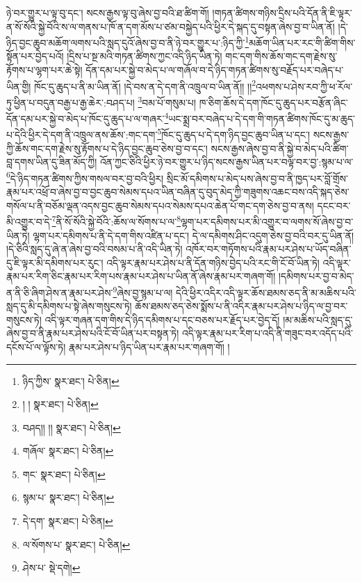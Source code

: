 ཉེ་བར་གྱུར་པ་ལྟ་བུ་དང་། སངས་རྒྱས་ལྟ་བུ་ཞེས་བྱ་བའི་ཐ་ཚིག་གོ། །གཏན་ཚིགས་གཉིས་དྲིས་པའི་དོན་ནི་ཇི་ལྟར་ན་སོ་སོའི་སྐྱེ་བོའི་ས་ལ་གནས་པ་ཁོ་ན་དག་མོས་པ་ཙམ་བསྐྱེད་པའི་ཕྱིར་དེ་སྐད་དུ་བསྟན་ཞེས་བྱ་བ་ཡིན་ནོ། །དེ་ཉིད་བྱང་ཆུབ་མཆོག་ལགས་པའི་སླད་དུའོ་ཞེས་བྱ་བ་ནི་ཉེ་བར་གྱུར་པ་:ཉིད་ཀྱི་\footnote{ཉིད་ཀྱིས་  སྣར་ཐང་།  པེ་ཅིན། }མཆོག་ཡིན་པར་རང་གི་ཚིག་གིས་སྟོན་པར་བྱེད་པའོ། །དྲིས་པ་སྔ་མའི་གཏན་ཚིགས་ཀྱང་འདི་ཉིད་ཡིན་ཏེ། གང་དག་གིས་ཆོས་གང་དག་རྗེས་སུ་རྟོགས་པ་ལྷག་པར་ཆེ་སྟེ། དོན་དམ་པར་སྐྱེ་བ་མེད་པ་ལ་གཞོལ་བ་དེ་ཉིད་གཏན་ཚིགས་སུ་བརྗོད་པར་བཞེད་པ་ཡིན་གྱི། ཁོང་དུ་ཆུད་པ་ནི་མ་ཡིན་ནོ། །དེ་བས་ན་དེ་དག་ནི་འཁྲུལ་བ་ཡིན་ནོ།། །།\footnote{། །  སྣར་ཐང་།  པེ་ཅིན། }འཕགས་པ་ཤེས་རབ་ཀྱི་ཕ་རོལ་ཏུ་ཕྱིན་པ་བདུན་བརྒྱ་པ་རྒྱ་ཆེར་:བཤད་པ། \footnote{བཤད།། །།   སྣར་ཐང་།  པེ་ཅིན། }བམ་པོ་གསུམ་པ། ཁ་ཅིག་ཆོས་དེ་དག་ཁོང་དུ་ཆུད་པར་བརྩོན་ཞིང་དོན་དམ་པར་སྐྱེ་བ་མེད་པ་ཁོང་དུ་ཆུད་པ་ལ་གཞར་\footnote{གཞོལ་  སྣར་ཐང་།  པེ་ཅིན། }ཡང་སྨྲ་བར་བཞེད་པ་དེ་དག་གི་གཏན་ཚིགས་ཁོང་དུ་མ་ཆུད་པ་དེའི་ཕྱིར་དེ་དག་ནི་འཁྲུལ་ནས་ཆོས་:གང་དག་\footnote{གང་  སྣར་ཐང་།  པེ་ཅིན། }ཁོང་དུ་ཆུད་པ་དེ་དག་ཉིད་བྱང་ཆུབ་ཡིན་པ་དང་། སངས་རྒྱས་ཀྱི་ཆོས་གང་དག་རྗེས་སུ་རྟོགས་པ་དེ་ཉིད་བྱང་ཆུབ་ཅེས་བྱ་བ་དང་། སངས་རྒྱས་ཞེས་བྱ་བ་ནི་སྐྱེ་བ་མེད་པའི་ཚིག་བླ་དགས་ཡིན་དུ་ཟིན་མོད་ཀྱི། འོན་ཀྱང་ཅིའི་ཕྱིར་ཉེ་བར་གྱུར་པ་ཉིད་སངས་རྒྱས་ཡིན་པར་བལྟ་བར་བྱ་:སྙམ་པ་ལ་\footnote{སྙམ་པ་  སྣར་ཐང་།  པེ་ཅིན། }དེ་ཉིད་གཏན་ཚིགས་ཀྱིས་གསལ་བར་བྱ་བའི་ཕྱིར། སྲིང་མོ་དམིགས་པ་མེད་པས་ཞེས་བྱ་བ་ནི་ཁྱད་པར་བློ་གྲོས་རྣམ་པར་འཕྲོ་བ་ཞེས་བྱ་བ་བྱང་ཆུབ་སེམས་དཔའ་ཡིན་བཞིན་དུ་བུད་མེད་ཀྱི་གཟུགས་འཆང་བས་འདི་སྐད་ཅེས་གསོལ་པ་ནི་བཅོམ་ལྡན་འདས་བྱང་ཆུབ་སེམས་དཔའ་སེམས་དཔའ་ཆེན་པོ་གང་དག་ཅེས་བྱ་བ་ནས། དངང་བར་མི་འགྱུར་བ་དེ་\footnote{དེ་དག་  སྣར་ཐང་།  པེ་ཅིན། }ནི་སོ་སོའི་སྐྱེ་བོའི་:ཆོས་ལ་སོགས་པ་ལ་\footnote{ལ་སོགས་པ་  སྣར་ཐང་།  པེ་ཅིན། }ལྷག་པར་དམིགས་པར་མི་འགྱུར་བ་ལགས་སོ་ཞེས་བྱ་བ་ཡིན་ཏེ། ལྷག་པར་དམིགས་པ་ནི་དེ་དག་གིས་འཛིན་པ་དང་། དེ་ལ་དམིགས་ཤིང་འདུག་ཅེས་བྱ་བའི་བར་དུ་ཡིན་ནོ། །དེ་ཅིའི་སླད་དུ་ཞེ་ན་ཞེས་བྱ་བའི་བསམ་པ་ནི་འདི་ཡིན་ཏེ། འཁོར་བར་གཏོགས་པའི་རྣམ་པར་ཤེས་པ་ཡོད་བཞིན་དུ་ཇི་ལྟར་མི་དམིགས་པར་རུང་། འདི་ལྟར་རྣམ་པར་ཤེས་པ་ནི་དོན་གཉིས་བྱེད་པའི་རང་གི་ངོ་བོ་ཡིན་ཏེ། འདི་ལྟར་རྣམ་པར་རིག་ཅིང་རྣམ་པར་རིག་པས་རྣམ་པར་ཤེས་པ་ཡིན་ནོ་ཞེས་རྣམ་པར་གཞག་གོ། །དམིགས་པར་བྱ་བ་མེད་ན་ནི་ཅི་ཞིག་ཤེས་ན་རྣམ་པར་ཤེས་\footnote{ཤེས་པ་  སྡེ་དགེ། }ཞེས་བྱ་སྙམ་པ་ལ། དེའི་ཕྱིར་འདིར་འདི་ལྟར་ཆོས་ཐམས་ཅད་ནི་མ་མཆིས་པའི་སླད་དུ་མི་དམིགས་པ་སྟེ་ཞེས་གསུངས་ཏེ། ཆོས་ཐམས་ཅད་ཅེས་སྨོས་པ་ནི་འདིར་རྣམ་པར་ཤེས་པ་ཉིད་ལ་བྱ་བར་གསུངས་ཏེ། འདི་ལྟར་གཞན་དག་གིས་དེ་ཉིད་དམིགས་པ་དང་བཅས་པར་རྗོད་པར་བྱེད་དོ། །མ་མཆིས་པའི་སླད་དུ་ཞེས་བྱ་བ་ནི་རྣམ་པར་ཤེས་པའི་ངོ་བོ་ཡིན་པར་བསྟན་ཏེ། འདི་ལྟར་རྣམ་པར་རིག་པ་འདི་ནི་གཟུང་བར་འདོད་པའི་དངོས་པོ་ལ་ལྟོས་ཏེ། རྣམ་པར་ཤེས་པ་ཉིད་ཡིན་པར་རྣམ་པར་གཞག་གོ། །
